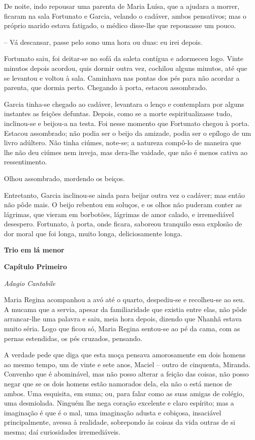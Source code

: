 De noite, indo repousar uma parenta de Maria Luísa, que a ajudara a
morrer, ficaram na sala Fortunato e Garcia, velando o cadáver, ambos
pensativos; mas o próprio marido estava fatigado, o médico disse-lhe que
repousasse um pouco.

-- Vá descansar, passe pelo sono uma hora ou duas: eu irei depois.

Fortunato saiu, foi deitar-se no sofá da saleta contígua e adormeceu
logo. Vinte minutos depois acordou, quis dormir outra vez, cochilou
alguns minutos, até que se levantou e voltou à sala. Caminhava nas
pontas dos pés para não acordar a parenta, que dormia perto. Chegando à
porta, estacou assombrado.

Garcia tinha-se chegado ao cadáver, levantara o lenço e contemplara por
alguns instantes as feições defuntas. Depois, como se a morte
espiritualizasse tudo, inclinou-se e beijou-a na testa. Foi nesse
momento que Fortunato chegou à porta. Estacou assombrado; não podia ser
o beijo da amizade, podia ser o epílogo de um livro adúltero. Não tinha
ciúmes, note-se; a natureza compô-lo de maneira que lhe não deu ciúmes
nem inveja, mas dera-lhe vaidade, que não é menos cativa ao
ressentimento.

Olhou assombrado, mordendo os beiços.

Entretanto, Garcia inclinou-se ainda para beijar outra vez o cadáver;
mas então não pôde mais. O beijo rebentou em soluços, e os olhos não
puderam conter as lágrimas, que vieram em borbotões, lágrimas de amor
calado, e irremediável desespero. Fortunato, à porta, onde ficara,
saboreou tranquilo essa explosão de dor moral que foi longa, muito
longa, deliciosamente longa.

\textbf{Trio em lá menor}

\textbf{Capítulo Primeiro}

\emph{Adagio Cantabile}

Maria Regina acompanhou a avó até o quarto, despediu-se e recolheu-se ao
seu. A mucama que a servia, apesar da familiaridade que existia entre
elas, não pôde arrancar-lhe uma palavra e saiu, meia hora depois,
dizendo que Nhanhã estava muito séria. Logo que ficou só, Maria Regina
sentou-se ao pé da cama, com as pernas estendidas, os pés cruzados,
pensando.

A verdade pede que diga que esta moça pensava amorosamente em dois
homens ao mesmo tempo, um de vinte e sete anos, Maciel -- outro de
cinquenta, Miranda. Convenho que é abominável, mas não posso alterar a
feição das coisas, não posso negar que se os dois homens estão namorados
dela, ela não o está menos de ambos. Uma esquisita, em suma; ou, para
falar como as suas amigas de colégio, uma desmiolada. Ninguém lhe nega
coração excelente e claro espírito; mas a imaginação é que é o mal, uma
imaginação adusta e cobiçosa, insaciável principalmente, avessa à
realidade, sobrepondo às coisas da vida outras de si mesma; daí
curiosidades irremediáveis.

